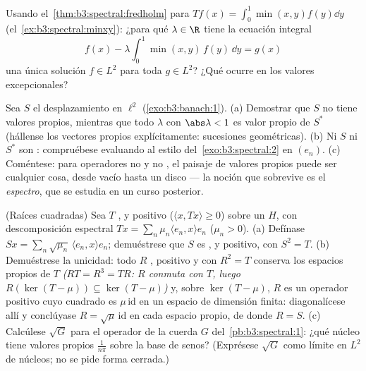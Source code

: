\begin{exercise}[$\star\star$]\label{exo:b3:spectral:9}
Usando el~\cref{thm:b3:spectral:fredholm} para $Tf(x) =
\int_0^1\min(x,y)f(y)\dd y$ (el~\cref{ex:b3:spectral:minxy}): ¿para qué
$\lambda \in \R$ tiene la ecuación integral
\[
f(x) - \lambda\int_0^1\min(x,y)\,f(y)\,\dd y = g(x)
\]
una única solución $f \in L^2$ para toda $g \in L^2$? ¿Qué ocurre en los
valores excepcionales?
\end{exercise}

\begin{exercise}[$\star\star\star$]\label{exo:b3:spectral:10}
Sea $S$ el desplazamiento en $\ell^2$
(\cref{exo:b3:banach:1}).
(a) Demostrar que $S$ no tiene valores propios, mientras que todo
$\lambda$ con $\abs\lambda < 1$ es valor propio de $S^*$ (hállense los
vectores propios explícitamente: sucesiones geométricas). (b) Ni $S$ ni
$S^*$ son : compruébese
evaluando al estilo del~\cref{exo:b3:spectral:2} en $(e_n)$. (c)
Coméntese: para operadores no
 y no , el
paisaje de valores propios puede ser cualquier cosa, desde vacío hasta
un disco  --- la noción que sobrevive es el \emph{espectro}, que
se estudia en un curso posterior.
\end{exercise}

\begin{exercise}[$\star\star$]\label{exo:b3:spectral:11}
(Raíces cuadradas) Sea $T$ ,
 y positivo
($\langle x, Tx\rangle \geq 0$) sobre un
 $H$, con
descomposición espectral $Tx = \sum_n\mu_n\langle e_n,
x\rangle e_n$ ($\mu_n > 0$). (a) Defínase
$Sx = \sum_n\sqrt{\mu_n}\,\langle e_n, x\rangle
e_n$; demuéstrese que $S$ es ,
 y positivo, con $S^2
= T$. (b) Demuéstrese la unicidad: todo $R$
, positivo y
 con $R^2 = T$ conserva
los espacios propios de $T$ \emph{($RT = R^3 = TR$: $R$ conmuta con $T$,
luego $R(\ker(T - \mu)) \subseteq \ker(T - \mu)$)} y, sobre
$\ker(T - \mu)$, $R$ es un operador positivo cuyo cuadrado es
$\mu\,\mathrm{id}$ en un espacio de dimensión finita: diagonalícese allí
y conclúyase $R =
\sqrt\mu\,\mathrm{id}$ en cada espacio propio, de donde $R = S$. (c)
Calcúlese $\sqrt G$ para el operador de la cuerda $G$
del~\cref{pb:b3:spectral:1}: ¿qué núcleo tiene valores propios
$\frac1{n\pi}$ sobre la base de senos? (Exprésese $\sqrt G$ como límite
en $L^2$ de núcleos; no se pide forma cerrada.)
\end{exercise}

